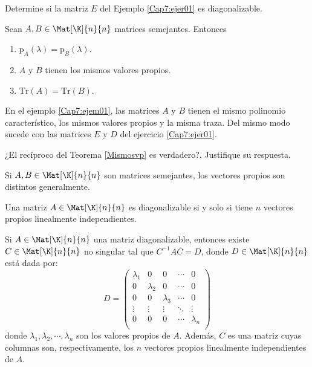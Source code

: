 \documentclass[compacto,10pt]{pubciencias-notas}
\begin{document}
\begin{ejer}
Determine si la matriz $E$ del Ejemplo \ref{Cap7:ejer01} es diagonalizable.
\end{ejer}
\begin{teo}\label{Mismosvp}
Sean $A,B \in \Mat[\K]{n}{n}$  matrices semejantes. Entonces
\begin{enumerate}
    \item $\text{p}_{A}(\lambda)=\text{p}_{B}(\lambda)$.
    \item $A$ y $B$ tienen los mismos valores propios.
    \item $\text{Tr}(A)=\text{Tr}(B)$.
\end{enumerate}
\end{teo}
\begin{ejem}
En el ejemplo \ref{Cap7:ejem01}, las matrices $A$ y $B$ tienen el mismo polinomio característico, los mismos valores propios y la misma traza. Del mismo modo sucede con las matrices $E$ y $D$ del ejercicio \ref{Cap7:ejer01}.
\end{ejem}
\begin{ejer}
¿El recíproco del Teorema \ref{Mismosvp} es verdadero?. Justifique su respuesta.
\end{ejer}
\begin{advertencia}
Si $A,B \in \Mat[\K]{n}{n}$ son matrices semejantes, los vectores propios son distintos generalmente.
\end{advertencia}
\begin{teo}
Una matriz $A \in \Mat[\K]{n}{n}$ es diagonalizable si y solo si tiene $n$ vectores propios linealmente independientes. 
\end{teo}

\begin{advertencia}
Si $A\in\Mat[\K]{n}{n}$ una matriz diagonalizable, entonces existe $C\in\Mat[\K]{n}{n}$ no singular tal que $C^{-1}AC = D$, donde $D \in \Mat[\K]{n}{n}$ está dada por:
\[
    D = 
    \begin{pmatrix}
     \lambda_1 & 0         & 0        & \cdots & 0 \\
             0 & \lambda_2 & 0        & \cdots & 0 \\
             0 &  0        & \lambda_3& \cdots & 0 \\
    \vdots     & \vdots    & \vdots   & \ddots & \vdots\\
      0        & 0         & 0        & \cdots & \lambda_n \\
\end{pmatrix}\]
donde $\lambda_1, \lambda_2,  \cdots, \lambda_n$ son los valores propios de $A$. Además, $C$ es una matriz cuyas columnas son, respectivamente, los $n$ vectores propios linealmente independientes de $A$.
\end{advertencia}
\end{document}
